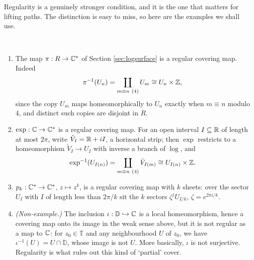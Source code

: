 \documentclass[a4paper]{scrartcl}
\newcommand{\disc}{\mathbb{D}}
\newcommand{\Cs}{\C^*}
\begin{document}
\begin{center}
\end{center}

Regularity is a genuinely stronger condition, and it is the one that matters for lifting
paths. The distinction is easy to miss, so here are the examples we shall use.

\begin{example}\
	\begin{enumerate}[label=(\roman*)]
		\item The map $\pi : R \to \Cs$ of Section \ref{sec:logsurface} is a regular
		covering map. Indeed
		$$
		\pi^{-1}(U_n) = \coprod_{m \equiv n \ (4)} U_m \cong U_n \times \mathbb{Z},
		$$
		since the copy $U_m$ maps homeomorphically to $U_n$ exactly when $m \equiv n$
		modulo $4$, and distinct such copies are disjoint in $R$.

		\item $\exp : \C \to \Cs$ is a regular covering map. For an open interval
		$I \subseteq \mathbb{R}$ of length at most $2\pi$, write $\tilde V_I = \mathbb{R} + iI$, a
		horizontal strip; then $\exp$ restricts to a homeomorphism $\tilde V_I \to U_I$
		with inverse a branch of $\log$, and
		$$
		\exp^{-1}(U_{I(n)}) = \coprod_{m \equiv n \ (4)} \tilde V_{I(m)} \cong U_{I(n)} \times \mathbb{Z}.
		$$

		\item $p_k : \Cs \to \Cs$, $z \mapsto z^k$, is a regular covering map with $k$
		sheets: over the sector $U_I$ with $I$ of length less than $2\pi/k$ sit the $k$
		sectors $\zeta^j U_{I/k}$, $\zeta = e^{2\pi i /k}$.

		\item \emph{(Non-example.)} The inclusion $\iota : \disc \hookrightarrow \C$ is a
		local homeomorphism, hence a covering map onto its image in the weak sense above,
		but it is not regular as a map to $\mathbb{C}$: for $z_0 \in \mathbb{T}$ and any
		neighbourhood $U$ of $z_0$, we have $\iota^{-1}(U) = U \cap \disc$, whose image is
		not $U$. More basically, $\iota$ is not surjective. Regularity is what rules out
		this kind of `partial' cover.
	\end{enumerate}
\end{example}
\end{document}
